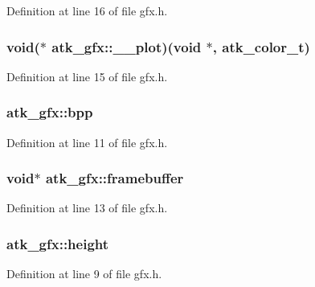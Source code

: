 Definition at line 16 of file gfx.\+h.

\hypertarget{structatk__gfx_ad0600b98849b356fa7d12a3e4237588b}{
\subsubsection[{\+\_\+\+\_\+plot}]{\setlength{\rightskip}{0pt plus 5cm}void($\ast$ atk\+\_\+gfx\+::\+\_\+\+\_\+plot)(void $\ast$, {\bf atk\+\_\+color\+\_\+t})}}\label{structatk__gfx_ad0600b98849b356fa7d12a3e4237588b}


Definition at line 15 of file gfx.\+h.

\hypertarget{structatk__gfx_a27d24c7a918386527067975cfd8da971}{
\subsubsection[{bpp}]{ atk\+\_\+gfx\+::bpp}}\label{structatk__gfx_a27d24c7a918386527067975cfd8da971}


Definition at line 11 of file gfx.\+h.

\hypertarget{structatk__gfx_a00413765e42e1a347e45401e1a2e95bf}{
\subsubsection[{framebuffer}]{\setlength{\rightskip}{0pt plus 5cm}void$\ast$ atk\+\_\+gfx\+::framebuffer}}\label{structatk__gfx_a00413765e42e1a347e45401e1a2e95bf}


Definition at line 13 of file gfx.\+h.

\hypertarget{structatk__gfx_a5dcdddc358345ad49f4015253f1acbe6}{
\subsubsection[{height}]{ atk\+\_\+gfx\+::height}}\label{structatk__gfx_a5dcdddc358345ad49f4015253f1acbe6}


Definition at line 9 of file gfx.\+h.

